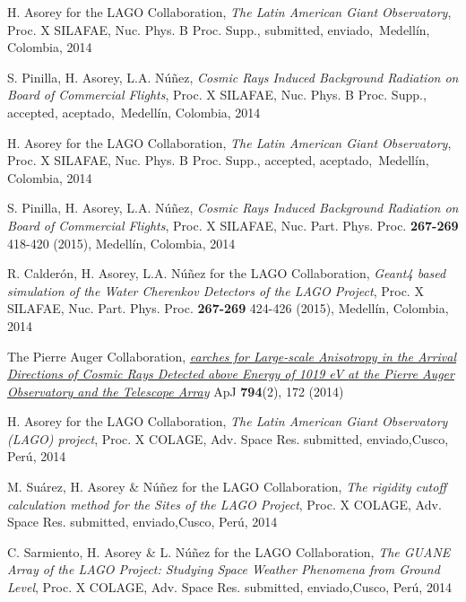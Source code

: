 \begin{etaremune}
\item {}H. Asorey for the LAGO Collaboration, {\emph{The Latin American Giant Observatory}}, \en Proc. X SILAFAE, Nuc. Phys. B Proc. Supp., \ifeng submitted, \else enviado,\fi\ Medellín, Colombia, 2014

\item {}S. Pinilla, H. Asorey, L.A. Núñez, {\emph{Cosmic Rays Induced Background Radiation on Board of Commercial Flights}}, \en Proc. X SILAFAE, Nuc. Phys. B Proc. Supp., \ifeng accepted, \else aceptado,\fi\ Medellín, Colombia, 2014

\item {}H. Asorey for the LAGO Collaboration, {\emph{The Latin American Giant Observatory}}, \en Proc. X SILAFAE, Nuc. Phys. B Proc. Supp., \ifeng accepted, \else aceptado,\fi\ Medellín, Colombia, 2014

\item {}S. Pinilla, H. Asorey, L.A. Núñez, {\emph{Cosmic Rays Induced Background Radiation on Board of Commercial Flights}}, \en Proc. X SILAFAE,  Nuc. Part. Phys. Proc. {\bf{267-269}} 418-420 (2015), Medellín, Colombia, 2014

\item {}R. Calderón, H. Asorey, L.A. Núñez for the LAGO Collaboration, {\emph{Geant4 based simulation of the Water Cherenkov Detectors of the LAGO Project}}, \en Proc. X SILAFAE, Nuc. Part. Phys. Proc. {\bf{267-269}} 424-426 (2015), Medellín, Colombia, 2014

\item {}The Pierre Auger Collaboration, \href{http://dx.doi.org/10.1088/0004-637X/794/2/172}{\emph{earches for Large-scale Anisotropy in the Arrival Directions of Cosmic Rays Detected above Energy of 1019 eV at the Pierre Auger Observatory and the Telescope Array}} ApJ {\bf{794}}(2), 172 (2014)

\item {}H. Asorey for the LAGO Collaboration, {\emph{The Latin American Giant Observatory (LAGO) project}}, \en Proc. X COLAGE, Adv. Space Res. \ifeng submitted, \else enviado,\fi  Cusco, Perú, 2014

\item {}M. Suárez, H. Asorey \& Núñez for the LAGO Collaboration, {\emph{The rigidity cutoff calculation method for the Sites of the LAGO Project}}, \en Proc. X COLAGE, Adv. Space Res. \ifeng submitted, \else enviado,\fi  Cusco, Perú, 2014

\item {}C. Sarmiento, H. Asorey \& L. Núñez for the LAGO Collaboration, {\emph{The GUANE Array of the LAGO Project: Studying Space Weather Phenomena from Ground Level}}, \en Proc. X COLAGE, Adv. Space Res. \ifeng submitted, \else enviado,\fi  Cusco, Perú, 2014


\end{etaremune}
